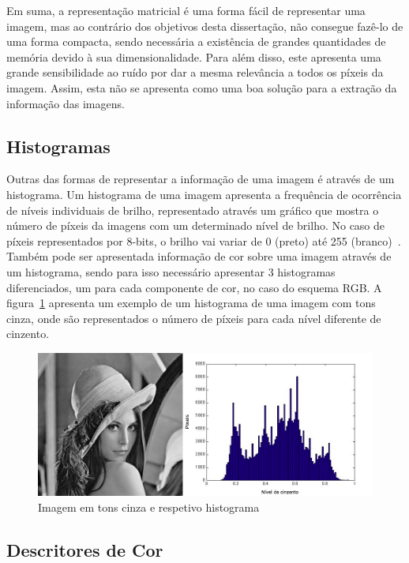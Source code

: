 Em suma, a representação matricial é uma forma fácil de representar uma imagem, mas ao contrário dos objetivos desta dissertação, não consegue fazê-lo de uma forma compacta, sendo necessária a existência de grandes quantidades de memória devido à sua dimensionalidade. Para além disso, este apresenta uma grande sensibilidade ao ruído por dar a mesma relevância a todos os píxeis da imagem. Assim, esta não se apresenta como uma boa solução para a extração da informação das imagens.

\subsection{Histogramas} \label{subsec:hist}

Outras das formas de representar a informação de uma imagem é através de um histograma. Um histograma de uma imagem apresenta a frequência de ocorrência de níveis individuais de brilho, representado através um gráfico que mostra o número de píxeis da imagens com um determinado nível de brilho. No caso de píxeis representados por 8-bits, o brilho vai variar de 0 (preto) até 255 (branco)~\citet{Nixon2002}. Também pode ser apresentada informação de cor sobre uma imagem através de um histograma, sendo para isso necessário apresentar 3 histogramas diferenciados, um para cada componente de cor, no caso do esquema RGB.
A figura~\ref{fig:lenahist} apresenta um exemplo de um histograma de uma imagem com tons cinza, onde são representados o número de píxeis para cada nível diferente de cinzento.

\begin{figure}[h]
\centering
\includegraphics[width=0.8\linewidth]{./figures/histlena}
\caption{Imagem em tons cinza e respetivo histograma }
\label{fig:lenahist}
\end{figure}

\subsection{Descritores de Cor}


